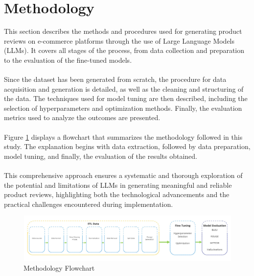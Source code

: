 \section{Methodology}
This section describes the methods and procedures used for generating product reviews on e-commerce platforms through the use of Large Language Models (LLMs). It covers all stages of the process, from data collection and preparation to the evaluation of the fine-tuned models.
\\\\
Since the dataset has been generated from scratch, the procedure for data acquisition and generation is detailed, as well as the cleaning and structuring of the data. The techniques used for model tuning are then described, including the selection of hyperparameters and optimization methods. Finally, the evaluation metrics used to analyze the outcomes are presented.
\\\\
Figure \ref{fig:MethodologyFlowchart} displays a flowchart that summarizes the methodology followed in this study. The explanation begins with data extraction, followed by data preparation, model tuning, and finally, the evaluation of the results obtained.
\\\\
This comprehensive approach ensures a systematic and thorough exploration of the potential and limitations of LLMs in generating meaningful and reliable product reviews, highlighting both the technological advancements and the practical challenges encountered during implementation.

\begin{figure}[H]
    \centering
    \includegraphics[width=12cm]{images/Methodology.jpg}
    \caption{Methodology Flowchart}
    \label{fig:MethodologyFlowchart}
\end{figure}
